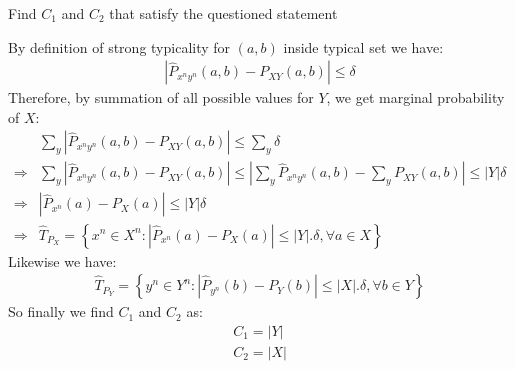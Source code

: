 \documentclass[
  course = {{EE623 Information Theory}},
  quartile = {{Fall 2020}},
  assignment = 7,
  name = {{Mohammad Mahdi Rahimi}},
  studentnumber = {{20208244}},
  email = {{mahi@kaist.ac.kr}},
  firstexercise = 1
]{aga-homework}
\begin{document}
\exercise
\subexercise Find $C_1$ and $C_2$ that satisfy the questioned statement

By definition of strong typicality for $(a,b)$ inside typical set we have:
\begin{equation} \label{eq8}
\begin{split}
\left|\hat{P}_{x^ny^n}(a,b) - P_{XY}(a,b) \right| \le \delta
\end{split}
\end{equation}
Therefore, by summation of all possible values for $Y$, we get marginal probability of $X$:
\begin{equation} \label{eq9}
\begin{split}
&\sum_y{\left|\hat{P}_{x^ny^n}(a,b) - P_{XY}(a,b) \right|} \le \sum_y{\delta}\\
\Rightarrow & \sum_y{\left|\hat{P}_{x^ny^n}(a,b) - P_{XY}(a,b) \right|} \le \left|\sum_y{\hat{P}_{x^ny^n}(a,b)} - \sum_y{P_{XY}(a,b)} \right| \le |Y|\delta\\
\Rightarrow & \left|\hat{P}_{x^n}(a) - P_{X}(a) \right| \le |Y|\delta\\
\Rightarrow & \hat{T}_{P_X} = \left\{x^n \in X^n : \left| \hat{P}_{x^n}(a) - P_X(a)\right| \le |Y|.\delta, \forall a \in X \right\}
\end{split}
\end{equation}
Likewise we have:
\begin{equation} \label{eq10}
\begin{split}
\hat{T}_{P_Y} = \left\{y^n \in Y^n : \left| \hat{P}_{y^n}(b) - P_Y(b)\right| \le |X|.\delta, \forall b \in Y \right\}
\end{split}
\end{equation}
So finally we find $C_1$ and $C_2$ as:
\begin{equation} \label{eq11}
\begin{split}
C_1 = |Y|\\
C_2 = |X|
\end{split}
\end{equation}
\end{document}

